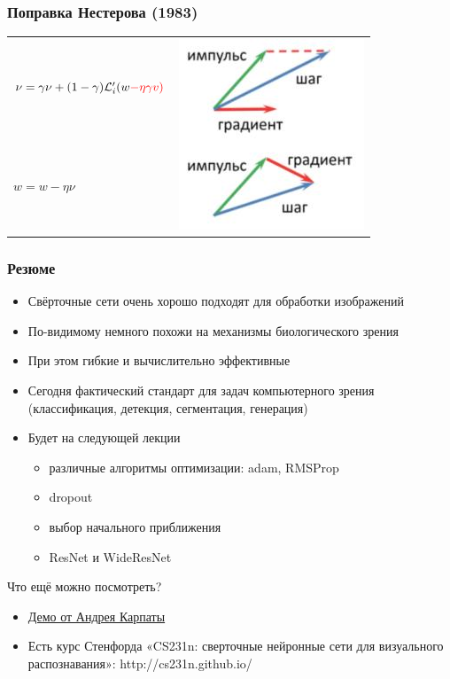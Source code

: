 \documentclass[fullscreen=true, bookmarks=true, hyperref={pdfencoding=unicode}]{beamer}
\begin{document}
\begin{frame}
  \frametitle{Поправка Нестерова (1983)}

\begin{tabular}{lr}
  $\nu = \gamma \nu + (1 - \gamma) \mathcal{L}_i^\prime (w \color{red}{- \eta \gamma v})$ &
  \multirow{2}{*}{\includegraphics[keepaspectratio,
                   width=0.3\paperwidth]{nesterov.jpg}} \\
    $w = w - \eta \nu$ &
\end{tabular}

\end{frame}


\begin{frame}
  \frametitle{Резюме}
  \begin{itemize}
    \item Свёрточные сети очень хорошо подходят для обработки изображений
    \item По-видимому немного похожи на механизмы биологического зрения
    \item При этом гибкие и вычислительно эффективные
    \item Сегодня фактический стандарт для задач компьютерного зрения (классификация, детекция, сегментация, генерация)
    \item Будет на следующей лекции
      \begin{itemize}
        \item различные алгоритмы оптимизации: adam, RMSProp
        \item dropout
        \item выбор начального приближения
        \item ResNet и WideResNet
      \end{itemize}
  \end{itemize}

  Что ещё можно посмотреть?
  \begin{itemize}
    \item \href{https://cs.stanford.edu/people/karpathy/convnetjs/}{Демо от Андрея Карпаты}
    \item Есть курс Стенфорда «CS231n: сверточные нейронные сети для визуального распознавания»: http://cs231n.github.io/
  \end{itemize}
\end{frame}
\end{document}
